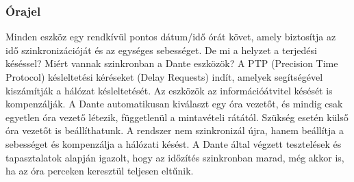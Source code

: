 \subsubsection{Órajel}
Minden eszköz egy rendkívül pontos dátum/idő órát követ, amely biztosítja az 
idő szinkronizációját és az egységes sebességet. De mi a helyzet a terjedési 
késéssel? Miért vannak szinkronban a Dante eszközök? A PTP (Precision Time Protocol) 
késleltetési kéréseket (Delay Requests) indít, amelyek segítségével kiszámítják 
a hálózat késleltetését. Az eszközök az információátvitel késését is kompenzálják. 
A Dante automatikusan kiválaszt egy óra vezetőt, és mindig csak egyetlen óra 
vezető létezik, függetlenül a mintavételi rátától. Szükség esetén külső óra 
vezetőt is beállíthatunk. A rendszer nem szinkronizál újra, hanem beállítja 
a sebességet és kompenzálja a hálózati késést. A Dante által végzett tesztelések 
és tapasztalatok alapján igazolt, hogy az időzítés szinkronban marad, még akkor 
is, ha az óra perceken keresztül teljesen eltűnik.

